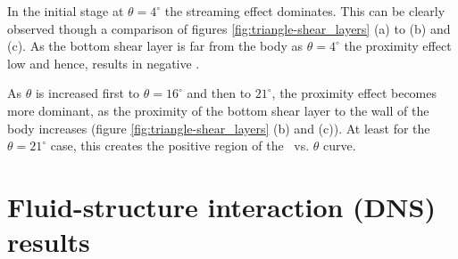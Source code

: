 In the initial stage at $\theta= 4^{\circ}$ the streaming effect dominates. This can be clearly observed though a comparison of figures \ref{fig:triangle-shear_layers} (a) to (b) and (c). As the bottom shear layer is far from the body as $\theta= 4^{\circ}$ the proximity effect low and hence, results in negative \cy. 

   
As $\theta$ is increased first to $\theta=16^{\circ}$ and then to $21^{\circ}$, the proximity effect becomes more dominant, as the proximity of the bottom shear layer to the wall of the body increases (figure \ref{fig:triangle-shear_layers} (b) and (c)). At least for the $\theta = 21^{\circ}$ case, this creates the positive region of the \cy\ vs. $\theta$ curve. 

 
 \section{Fluid-structure interaction (DNS) results}
 \label{sec:FSI-results}
 
 
 
 
 
 
%  
%  
%  
%  
%  
%  
 
 
 
 
 
 
 
 
